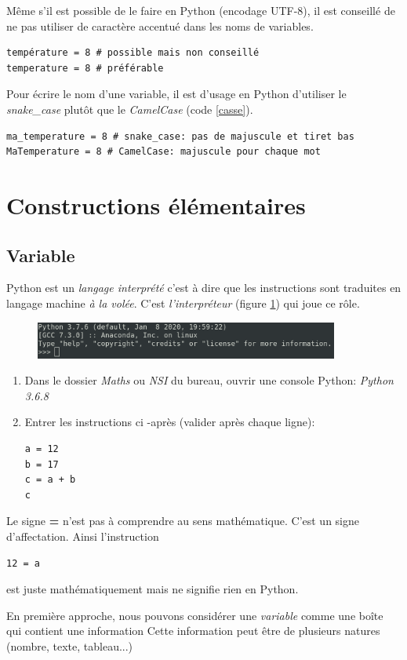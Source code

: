 \documentclass[a4paper,11pt]{article}
\begin{document}
\begin{Form}
Même s'il est possible de le faire en Python (encodage UTF-8), il est conseillé de ne pas utiliser de caractère accentué dans les noms de variables.
\begin{code}[!h]
\begin{lstlisting}
température = 8 # possible mais non conseillé
temperature = 8 # préférable
\end{lstlisting}
\label{accent}
\end{code}

Pour écrire le nom d'une variable, il est d'usage en Python d'utiliser le \emph{snake\_case} plutôt que le \emph{CamelCase} (code \ref{casse}).
\begin{code}[!h]
\begin{lstlisting}
ma_temperature = 8 # snake_case: pas de majuscule et tiret bas
MaTemperature = 8 # CamelCase: majuscule pour chaque mot
\end{lstlisting}
\label{casse}
\end{code}
\section{Constructions élémentaires}
\subsection{Variable}
Python est un \emph{langage interprété} c'est à dire que les instructions sont traduites en langage machine \emph{à la volée}. C'est \emph{l'interpréteur} (figure \ref{console}) qui joue ce rôle.
\begin{figure}[!h]
\centering
\includegraphics[width=10cm]{ressources/console.png}
\label{console}
\end{figure}
\begin{activite}
\begin{enumerate}
\item Dans le dossier \emph{Maths} ou \emph{NSI} du bureau, ouvrir une console Python: \emph{Python 3.6.8}
\item Entrer les instructions ci -après (valider après chaque ligne):
\begin{lstlisting}
a = 12
b = 17
c = a + b
c
\end{lstlisting}
\end{enumerate}
\end{activite}
\begin{aretenir}
Le signe \textbf{=} n'est pas à comprendre au sens mathématique. C'est un signe d'affectation. Ainsi l'instruction
\begin{lstlisting}
12 = a
\end{lstlisting}
est juste mathématiquement mais ne signifie rien en Python.
\end{aretenir}
En première approche, nous pouvons considérer une \emph{variable} comme une boîte qui contient une information Cette information peut être de plusieurs natures (nombre, texte, tableau...)

\end{Form}
\end{document}
